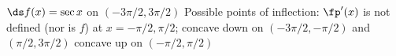 {$\ds f(x) = \sec x $ on $(-3\pi/2,3\pi/2)$
}
{Possible points of inflection: $\fp'(x)$ is not defined (nor is $f$) at $x=-\pi/2,\pi/2$;
concave down on $(-3\pi/2,-\pi/2)$ and $(\pi/2,3\pi/2)$
concave up on $(-\pi/2,\pi/2)$
}
